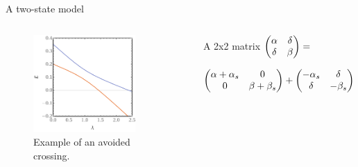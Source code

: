 \documentclass[xcolor=x11names,compress]{beamer}
\renewcommand{\(}{\begin{columns}}
\renewcommand{\)}{\end{columns}}
\newcommand{\<}[1]{\begin{column}{#1}}
\renewcommand{\>}{\end{column}}
\begin{document}
\begin{frame}{A two-state model}

\begin{columns}


\begin{figure}
    \centering
    \includegraphics[width=0.8\textwidth]{avoidedcrossing.pdf}
    \caption{Example of an avoided crossing.}
    \label{fig:my_label}
\end{figure}


\begin{beamerboxesrounded}[scheme=foncé]{A 2x2 matrix}
\centering \small{$\mqty(\alpha & \delta \\ \delta & \beta)  =$} 

\vspace{0.15cm}

\small{$\mqty(\alpha + \alpha_s & 0 \\ 0 & \beta + \beta_s ) + \mqty(- \alpha_s & \delta \\ \delta & - \beta_s)$}

\end{beamerboxesrounded}
\vspace{1cm}
\end{columns}

    
\end{frame}
\end{document}

